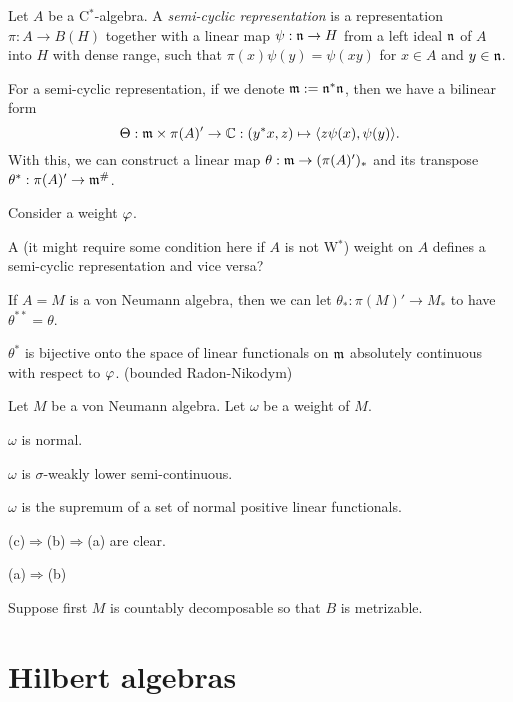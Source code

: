 \documentclass{../../large}
\begin{document}
\begin{prb}
Let $A$ be a C$^*$-algebra.
A \emph{semi-cyclic representation} is a representation $\pi:A\to B(H)$ together with a linear map $\psi:\mathfrak{n}\to H$ from a left ideal $\mathfrak{n}$ of $A$ into $H$ with dense range, such that $\pi(x)\psi(y)=\psi(xy)$ for $x\in A$ and $y\in\mathfrak{n}$.

For a semi-cyclic representation, if we denote $\mathfrak{m}:=\mathfrak{n}^*\mathfrak{n}$, then we have a bilinear form
\[\Theta:\mathfrak{m}\times\pi(A)'\to\mathbb{C}:(y^*x,z)\mapsto\langle z\psi(x),\psi(y)\rangle.\]
With this, we can construct a linear map $\theta:\mathfrak{m}\to(\pi(A)')_*$ and its transpose $\theta^*:\pi(A)'\to\mathfrak{m}^\#$.

Consider a weight $\varphi$.
\begin{parts}
\item A (it might require some condition here if $A$ is not W$^*$) weight on $A$ defines a semi-cyclic representation and vice versa?
\item If $A=M$ is a von Neumann algebra, then we can let $\theta_*:\pi(M)'\to M_*$ to have $\theta^{**}=\theta$.
\item $\theta^*$ is bijective onto the space of linear functionals on $\mathfrak{m}$ absolutely continuous with respect to $\varphi$. (bounded Radon-Nikodym)
\end{parts}
\end{prb}



\begin{prb}
Let $M$ be a von Neumann algebra.
Let $\omega$ be a weight of $M$.
\begin{parts}
\item $\omega$ is normal.
\item $\omega$ is $\sigma$-weakly lower semi-continuous.
\item $\omega$ is the supremum of a set of normal positive linear functionals.
\end{parts}
\end{prb}
\begin{pf}
(c)$\Rightarrow$(b)$\Rightarrow$(a) are clear.

(a)$\Rightarrow$(b)


Suppose first $M$ is countably decomposable so that $B$ is metrizable.




\end{pf}




\section{Hilbert algebras}
\end{document}

